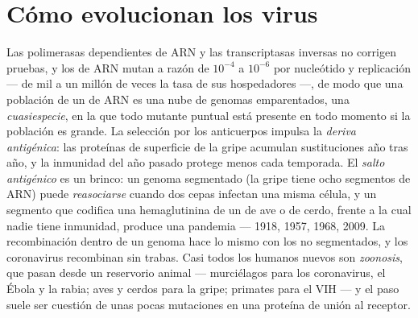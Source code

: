 \section{Cómo evolucionan los virus}

\begin{definition}\label{def:b3:virology:evolution}
Las polimerasas dependientes de ARN y las transcriptasas inversas no
corrigen pruebas, y los  de ARN mutan a razón de $10^{-4}$ a
$10^{-6}$ por nucleótido y replicación --- de mil a un millón de veces la
tasa de sus hospedadores ---, de modo que una población de un  de
ARN es una nube de genomas emparentados, una \emph{cuasiespecie}, en la
que todo mutante puntual está presente en todo momento si la población es
grande. La selección por los anticuerpos impulsa la \emph{deriva
antigénica}: las proteínas de superficie de la gripe acumulan
sustituciones año tras año, y la inmunidad del año pasado protege menos
cada temporada. El \emph{salto antigénico} es un brinco: un genoma
segmentado (la gripe tiene ocho segmentos de ARN) puede
\emph{reasociarse} cuando dos cepas infectan una misma célula, y un
segmento que codifica una hemaglutinina de un  de ave o de cerdo,
frente a la cual nadie tiene inmunidad, produce una pandemia --- 1918,
1957, 1968, 2009. La recombinación dentro de un genoma hace lo mismo con
los  no segmentados, y los coronavirus recombinan sin trabas. Casi
todos los  humanos nuevos son \emph{zoonosis}, que pasan desde un
reservorio animal --- murciélagos para los coronavirus, el Ébola y la
rabia; aves y cerdos para la gripe; primates para el VIH --- y el paso
suele ser cuestión de unas pocas mutaciones en una proteína de unión al
receptor.
\end{definition}

